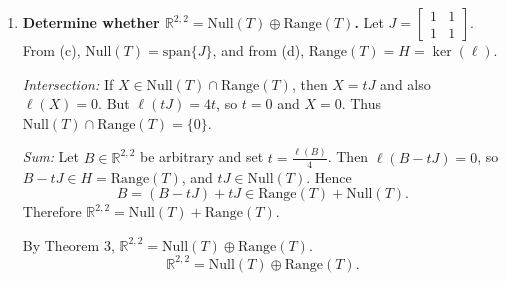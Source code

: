 \documentclass[12pt]{article}
\newcommand{\R}{\mathbb{R}}
\begin{document}
\begin{enumerate}[label=(\alph*)]
Now exhibit three linearly independent elements of $\mathrm{Range}(T)$:
\[
R_1:=T(E_{11})=\begin{bmatrix}-1&2\\-1&0\end{bmatrix},\quad
R_2:=T(E_{12})=\begin{bmatrix}1&1\\-2&0\end{bmatrix},\quad
R_3:=T(E_{21})=\begin{bmatrix}0&-2\\1&1\end{bmatrix}.
\]
If $\alpha R_1+\beta R_2+\gamma R_3=0$, then comparing the $(2,2)$ entry gives $\gamma=0$; then comparing $(1,1)$ and $(2,1)$ gives $-\alpha+\beta=0$ and $-\alpha-2\beta=0$, hence $\alpha=\beta=0$.
Thus $R_1,R_2,R_3$ are linearly independent, so $\dim\mathrm{Range}(T)\ge 3$.
Since $\mathrm{Range}(T)\subseteq H$ and $\dim(H)=3$, it follows that $\mathrm{Range}(T)=H$ and $\{R_1,R_2,R_3\}$ is a basis of $\mathrm{Range}(T)$.
\[
\boxed{\,\text{A basis for }\mathrm{Range}(T)\text{ is }\left\{
\begin{bmatrix}-1&2\\-1&0\end{bmatrix},
\begin{bmatrix}1&1\\-2&0\end{bmatrix},
\begin{bmatrix}0&-2\\1&1\end{bmatrix}
\right\}.\,}
\]

\item \textbf{Determine whether $\R^{2,2}=\mathrm{Null}(T)\oplus \mathrm{Range}(T)$.}
Let $J=\begin{bmatrix}1&1\\1&1\end{bmatrix}$. From (c), $\mathrm{Null}(T)=\mathrm{span}\{J\}$, and from (d), $\mathrm{Range}(T)=H=\ker(\ell)$.

\emph{Intersection:} If $X\in \mathrm{Null}(T)\cap \mathrm{Range}(T)$, then $X=tJ$ and also $\ell(X)=0$. But $\ell(tJ)=4t$, so $t=0$ and $X=0$. Thus $\mathrm{Null}(T)\cap \mathrm{Range}(T)=\{0\}$.

\emph{Sum:} Let $B\in \R^{2,2}$ be arbitrary and set $t=\frac{\ell(B)}{4}$. Then $\ell(B-tJ)=0$, so $B-tJ\in H=\mathrm{Range}(T)$, and $tJ\in \mathrm{Null}(T)$. Hence
\[
B=(B-tJ)+tJ\in \mathrm{Range}(T)+\mathrm{Null}(T).
\]
Therefore $\R^{2,2}=\mathrm{Null}(T)+\mathrm{Range}(T)$.

By Theorem 3, $\R^{2,2}=\mathrm{Null}(T)\oplus \mathrm{Range}(T)$.
\[
\boxed{\,\R^{2,2}=\mathrm{Null}(T)\oplus \mathrm{Range}(T).\,}
\]
\end{enumerate}
\end{document}
